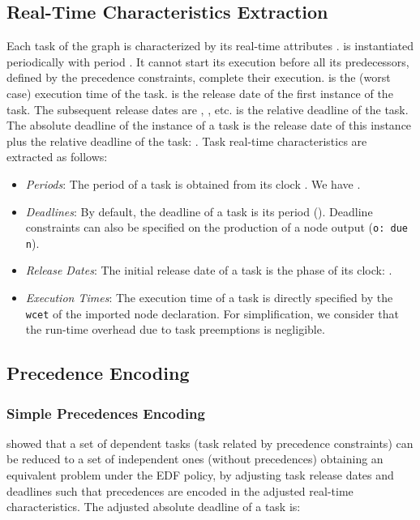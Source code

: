 \subsection{Real-Time Characteristics Extraction}
Each task  of the graph is characterized by its
real-time attributes .  is instantiated
periodically with period . It cannot start its execution before all
its predecessors, defined by the precedence constraints, complete their
execution.  is the (worst case) execution time of the task. 
is the release date of the first instance of the task. The subsequent
release dates are , , etc.  is the relative
deadline of the task. The absolute deadline  of the instance 
of a task  is the release date  of this instance plus
the relative deadline of the task: .  Task real-time
characteristics are extracted as follows:
\begin{itemize}
\item \emph{Periods}: The period of a task is obtained from its clock . We have .
\item \emph{Deadlines}: By default, the deadline of a task is its period (). Deadline
constraints can also be specified on the production of a node output
(\lstinline!o: due n!).
\item \emph{Release Dates}: The initial release date of a task is the phase of its clock:
.
\item \emph{Execution Times}: The execution time  of a task is
  directly specified by the \lstinline!wcet! of the imported node
  declaration. For simplification, we consider that the run-time
  overhead due to task preemptions is negligible.
\end{itemize}





\subsection{Precedence Encoding}
\label{sec:prec-encoding}
\subsubsection{Simple Precedences Encoding}
\cite{chetto90} showed that a set of dependent tasks (task related by
precedence constraints) can be reduced to a set of independent ones
(without precedences) obtaining an equivalent problem under the EDF
policy, by adjusting task release dates and deadlines such that
precedences are encoded in the adjusted real-time characteristics. The
adjusted absolute deadline  of a task is:

